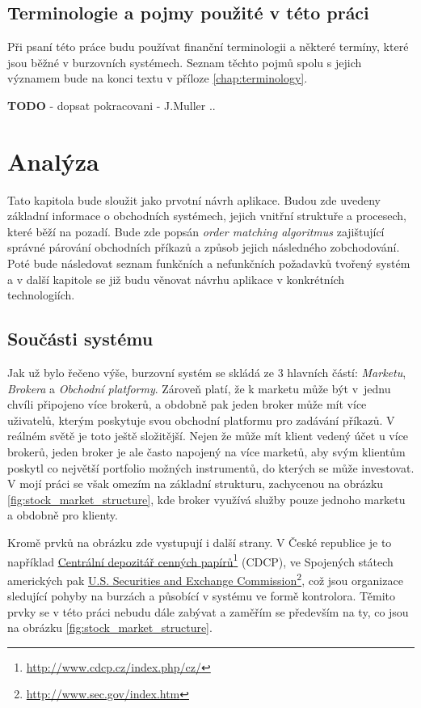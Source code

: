 \documentclass[thesis=M,czech]{FITthesis}[2012/06/26]
\newcommand\fnurl[2]{\href{#2}{#1}\footnote{\url{#2}}}
\begin{document}
\section{Terminologie a pojmy použité v této práci}
	
	Při psaní této práce  budu používat finanční terminologii a některé termíny, které jsou běžné v burzovních systémech. Seznam těchto pojmů spolu s jejich významem bude na konci textu v příloze \ref{chap:terminology}.


\textbf{TODO} - dopsat pokracovani - J.Muller .. 

\chapter{Analýza}
\label{chap:analysis}

	Tato kapitola bude sloužit jako prvotní návrh aplikace. Budou zde uvedeny základní informace o obchodních systémech, jejich vnitřní struktuře a procesech, které běží na pozadí. Bude zde popsán \textit{order matching algoritmus} zajištující správné párování obchodních příkazů a způsob jejich následného zobchodování.
	Poté bude následovat seznam funkčních a nefunkčních požadavků tvořený systém a v další kapitole se již budu věnovat návrhu aplikace v konkrétních technologiích. 

\section{Součásti systému}

	Jak už bylo řečeno výše, burzovní systém se skládá ze 3 hlavních částí: \textit{Marketu}, \textit{Brokera} a \textit{Obchodní platformy}. Zároveň platí, že k marketu může být v~jednu chvíli připojeno více brokerů, a obdobně pak jeden broker může mít více uživatelů, kterým poskytuje svou obchodní platformu pro zadávání příkazů. V reálném světě je toto ještě složitější. Nejen že může mít klient vedený účet u více brokerů, jeden broker je ale často napojený na více marketů, aby svým klientům poskytl co největší portfolio možných instrumentů, do kterých se může investovat. V mojí práci se však omezím na základní strukturu, zachycenou na obrázku \ref{fig:stock_market_structure}, kde broker využívá služby pouze jednoho marketu a obdobně pro klienty. 
	
	Kromě prvků na obrázku zde vystupují i další strany. V České republice je to například \fnurl{Centrální depozitář cenných papírů}{http://www.cdcp.cz/index.php/cz/} (CDCP), ve Spojených státech amerických pak \fnurl{U.S. Securities and Exchange Commission}{http://www.sec.gov/index.htm}, což jsou organizace sledující pohyby na burzách a působící v systému ve formě kontrolora. Těmito prvky se v této práci nebudu dále zabývat a zaměřím se především na ty, co jsou na obrázku \ref{fig:stock_market_structure}.
\end{document}
